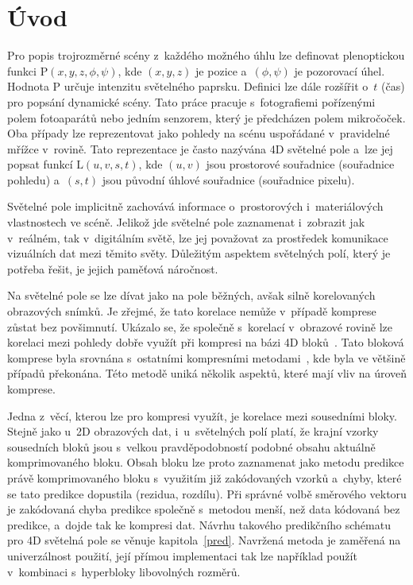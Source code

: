 
\section{Úvod}

Pro popis trojrozměrné scény z~každého možného úhlu lze definovat plenoptickou funkci $\mathrm{P}(x,y,z,\phi,\psi)$, kde $(x,y,z)$ je pozice a~$(\phi,\psi)$ je pozorovací úhel.
Hodnota $\mathrm{P}$ určuje intenzitu světelného paprsku.
Definici lze dále rozšířit o~$t$ (čas) pro popsání dynamické scény.
Tato práce pracuje s~fotografiemi pořízenými polem fotoaparátů nebo jedním senzorem, který je předcházen polem mikročoček.
Oba případy lze reprezentovat jako pohledy na scénu uspořádané v~pravidelné mřížce v~rovině.
Tato reprezentace je často nazývána 4D světelné pole a~lze jej popsat funkcí $\mathrm{L}(u,v,s,t)$, kde $(u,v)$ jsou pro\-s\-torové souřadnice (souřadnice pohledu) a~$(s,t)$ jsou původní úhlové souřadnice (souřadnice pixelu).

Světelné pole implicitně zachovává informace o~pro\-s\-torových i~materiálových vlastnostech ve scéně.
Jelikož jde světelné pole zaznamenat i~zobrazit jak v~reálném, tak v~digitálním světě, lze jej považovat za pro\-stře\-dek komunikace vizuálních dat mezi těmito světy.
Důležitým aspektem světelných polí, který je potřeba řešit, je jejich paměťová náročnost.

Na světelné pole se lze dívat jako na pole běžných, avšak silně korelovaných obrazových snímků.
Je zřejmé, že tato korelace nemůže v~případě kom\-pre\-se zůstat bez povšimnutí.
Ukázalo se, že společně s~korelací v~obrazové rovině lze korelaci mezi pohledy dobře využít při kom\-pre\-si na bázi 4D bloků~\cite{Dlabaja2018}.
Tato bloková komprese byla srovnána s~ostatními kompresními metodami~\cite{Barina2019}, kde byla ve většině případů překonána.
Této me\-to\-dě uniká ně\-ko\-lik aspektů, které mají vliv na úroveň kom\-pre\-se.

Jedna z~věcí, kterou lze pro kom\-pre\-si využít, je korelace mezi sousedními bloky.
Stejně jako u~2D obrazových dat, i~u~světelných polí platí, že krajní vzorky sousedních bloků jsou s~velkou pravděpodobností podobné obsahu aktuálně komprimovaného bloku.
Obsah bloku lze proto zaznamenat jako me\-to\-du pre\-dikce právě komprimovaného bloku s~využitím již zakódovaných vzorků a~chyby, které se tato pre\-dikce dopustila (rezidua, rozdílu).
Při správné volbě směr\-ového vektoru je zakódovaná chyba pre\-dikce společně s~me\-to\-dou menší, než data kódovaná bez pre\-dikce, a~dojde tak ke kom\-pre\-si dat.
Návrhu takového pre\-dikčního schématu pro 4D světelná pole se věnuje kapitola~\ref{pred}.
Navržená me\-to\-da je zaměřená na univerzálnost použití, její přímou implementaci tak lze například použít v~kom\-bi\-na\-ci s~hyperbloky libovolných roz\-měrů.

